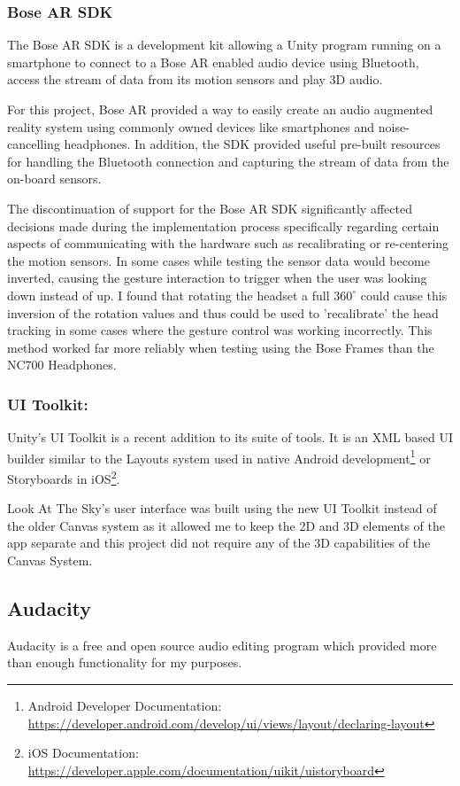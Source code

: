 \documentclass{l4proj}
\begin{document}
\subsubsection{Bose AR SDK}
The Bose AR SDK is a development kit allowing a Unity program running on a smartphone to connect to a Bose AR enabled audio device using Bluetooth, access the stream of data from its motion sensors and play 3D audio.

For this project, Bose AR provided a way to easily create an audio augmented reality system using commonly owned devices like smartphones and noise-cancelling headphones. In addition, the SDK provided useful pre-built resources for handling the Bluetooth connection and capturing the stream of data from the on-board sensors. 

The discontinuation of support for the Bose AR SDK significantly affected decisions made during the implementation process specifically regarding certain aspects of communicating with the hardware such as recalibrating or re-centering the motion sensors. In some cases while testing the sensor data would become inverted, causing the gesture interaction to trigger when the user was looking down instead of up. I found that rotating the headset a full $360^{\circ}$ could cause this inversion of the rotation values and thus could be used to 'recalibrate' the head tracking in some cases where the gesture control was working incorrectly. This method worked far more reliably when testing using the Bose Frames than the NC700 Headphones.


\subsubsection{UI Toolkit:}
Unity's UI Toolkit is a recent addition to its suite of tools. It is an XML based UI builder similar to the Layouts system used in native Android development\footnote{Android Developer Documentation: \url{https://developer.android.com/develop/ui/views/layout/declaring-layout}} or Storyboards in iOS\footnote{iOS Documentation: \url{https://developer.apple.com/documentation/uikit/uistoryboard}}.

Look At The Sky's user interface was built using the new UI Toolkit instead of the older Canvas system as it allowed me to keep the 2D and 3D elements of the app separate and this project did not require any of the 3D capabilities of the Canvas System.


\subsection{Audacity}
Audacity is a free and open source audio editing program which provided more than enough functionality for my purposes.
\end{document}
